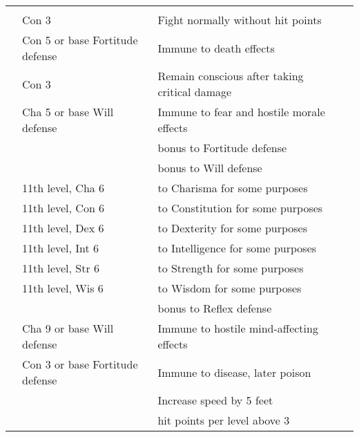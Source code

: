 {\small
{}
\begin{longtabu}{>{\lcol}p{10em} >{\lcol}p{15em} >{\lcol}X >{\lcol}p{3em}}
     &  &  &  \\
     & Con 3 & Fight normally without hit points &  \\
     & Con 5 or base Fortitude defense  & Immune to death effects &  \\
     & Con 3 & Remain conscious after taking critical damage &  \\
     & Cha 5 or base Will defense  & Immune to fear and hostile morale effects &  \\
     & \x &   bonus to Fortitude defense &  \\
     & \x &  bonus to Will defense &  \\
     & 11th level, Cha 6 &  to Charisma for some purposes &  \\
     & 11th level, Con 6 &  to Constitution for some purposes &  \\
     & 11th level, Dex 6 &  to Dexterity for some purposes &  \\
     & 11th level, Int 6 &  to Intelligence for some purposes &  \\
     & 11th level, Str 6 &  to Strength for some purposes &  \\
     & 11th level, Wis 6 &  to Wisdom for some purposes &  \\
     & \x &   bonus to Reflex defense &  \\
     & Cha 9 or base Will defense  & Immune to hostile mind-affecting effects &  \\
     & Con 3 or base Fortitude defense  & Immune to disease, later poison &  \\
     & \x & Increase speed by 5 feet &  \\
     & \x &   hit points  per level above 3 &  \\


\end{longtabu}}
